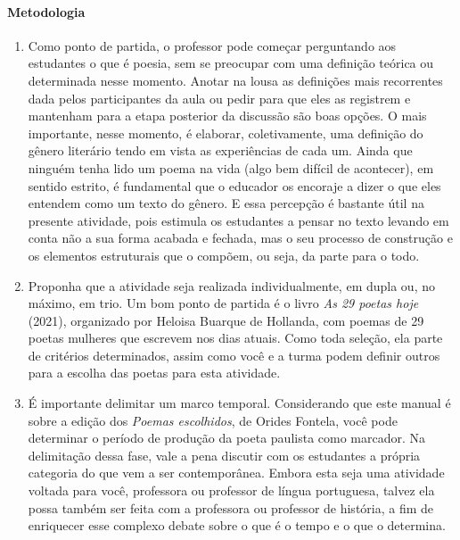 \documentclass[12pt]{extarticle}
\begin{document}
\paragraph{Metodologia}
\begin{enumerate}
\item Como ponto de partida, o professor pode começar
perguntando aos estudantes o que é poesia, sem se preocupar com uma
definição teórica ou determinada nesse momento. Anotar na lousa as
definições mais recorrentes dada pelos participantes da aula ou pedir
para que eles as registrem e mantenham para a etapa posterior da
discussão são boas opções. O mais importante, nesse momento, é elaborar,
coletivamente, uma definição do gênero literário tendo em vista as
experiências de cada um. Ainda que ninguém tenha lido um poema na vida
(algo bem difícil de acontecer), em sentido estrito, é fundamental que o
educador os encoraje a dizer o que eles entendem como um texto do
gênero. E essa percepção é bastante útil na presente atividade, pois
estimula os estudantes a pensar no texto levando em conta não a sua
forma acabada e fechada, mas o seu processo de construção e os elementos
estruturais que o compõem, ou seja, da parte para o todo.

\item Proponha que a atividade seja realizada individualmente, em dupla ou,
no máximo, em trio. Um bom ponto de partida é o livro \emph{As 29 poetas
hoje} (2021), organizado por Heloisa Buarque de Hollanda, com poemas de
29 poetas mulheres que escrevem nos dias atuais. Como toda seleção, ela
parte de critérios determinados, assim como você e a turma podem definir
outros para a escolha das poetas para esta atividade.



\item É importante delimitar um marco temporal. Considerando que este
manual é sobre a edição dos \emph{Poemas escolhidos}, de Orides Fontela,
você pode determinar o período de produção da poeta paulista como
marcador. Na delimitação dessa fase, vale a pena discutir com os
estudantes a própria categoria do que vem a ser contemporânea. Embora
esta seja uma atividade voltada para você, professora ou professor de
língua portuguesa, talvez ela possa também ser feita com a professora ou
professor de história, a fim de enriquecer esse complexo debate sobre o
que é o tempo e o que o determina.


\end{enumerate}
\end{document}
